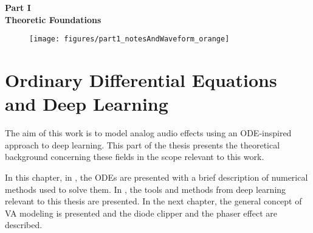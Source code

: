 \cleardoublepage
\thispagestyle{empty}
\begin{center}
\vspace*{3cm}
{\huge \bf Part I}\\ \vspace*{1cm}
{\Huge \bf Theoretic Foundations}\\\vspace*{0.2cm}
\begin{figure}[ht]
\centering
\texttt{[image: figures/part1\_notesAndWaveform\_orange]}
\end{figure}
\end{center}
\label{par:part1}
\newpage
\quad
\thispagestyle{empty}
\newpage



\chapter{Ordinary Differential Equations and Deep Learning}
\label{chapter:odes_and_dl}

The aim of this work is to model analog audio effects using an \ac{ODE}-inspired approach to deep learning. This part of the thesis presents the theoretical background concerning these fields in the scope relevant to this work. 

In this chapter, in , the \acp{ODE} are presented with a brief description of numerical methods used to solve them. In , the tools and methods from deep learning relevant to this thesis are presented. In the next chapter, the general concept of \ac{VA} modeling is presented and the diode clipper and the phaser effect are described.



